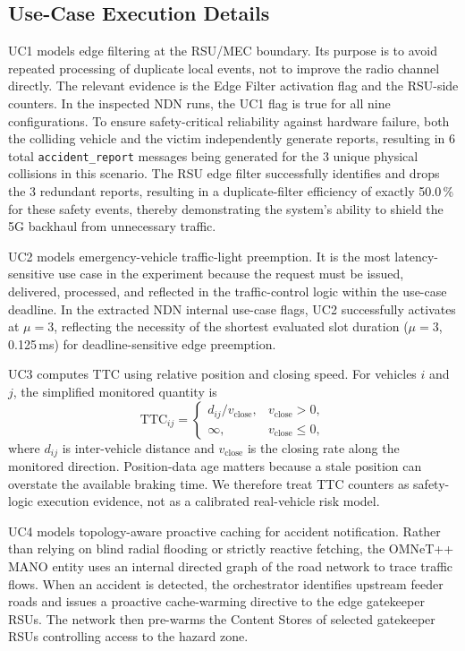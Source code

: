 \documentclass[journal]{IEEEtran}
\newcommand{\code}[1]{\texttt{\small #1}}
\begin{document}
\subsection{Use-Case Execution Details}

UC1 models edge filtering at the RSU/MEC boundary. Its purpose is to avoid repeated processing of duplicate local events, not to improve the radio channel directly. The relevant evidence is the Edge Filter activation flag and the RSU-side counters. In the inspected NDN runs, the UC1 flag is true for all nine configurations. To ensure safety-critical reliability against hardware failure, both the colliding vehicle and the victim independently generate reports, resulting in 6 total \code{accident\_report} messages being generated for the 3 unique physical collisions in this scenario. The RSU edge filter successfully identifies and drops the 3 redundant reports, resulting in a duplicate-filter efficiency of exactly 50.0\,\% for these safety events, thereby demonstrating the system's ability to shield the 5G backhaul from unnecessary traffic.

UC2 models emergency-vehicle traffic-light preemption. It is the most latency-sensitive use case in the experiment because the request must be issued, delivered, processed, and reflected in the traffic-control logic within the use-case deadline. In the extracted NDN internal use-case flags, UC2 successfully activates at $\mu=3$, reflecting the necessity of the shortest evaluated slot duration ($\mu=3$, 0.125\,ms) for deadline-sensitive edge preemption.

UC3 computes TTC using relative position and closing speed. For vehicles $i$ and $j$, the simplified monitored quantity is
\begin{equation}
  \mathrm{TTC}_{ij} =
  \begin{cases}
    d_{ij}/v_{\mathrm{close}}, & v_{\mathrm{close}}>0,\\
    \infty, & v_{\mathrm{close}}\le 0,
  \end{cases}
  \label{eq:ttc}
\end{equation}
where $d_{ij}$ is inter-vehicle distance and $v_{\mathrm{close}}$ is the
closing rate along the monitored direction. Position-data age matters because a stale position can overstate the available braking time. We therefore treat TTC counters as safety-logic execution evidence, not as a calibrated real-vehicle risk model.


UC4 models topology-aware proactive caching for accident notification. Rather than relying on blind radial flooding or strictly reactive fetching, the OMNeT++ MANO entity uses an internal directed graph of the road network to trace traffic flows. When an accident is detected, the orchestrator identifies upstream feeder roads and issues a proactive cache-warming directive to the edge gatekeeper RSUs. The network then pre-warms the Content Stores of selected gatekeeper RSUs controlling access to the hazard zone.
\end{document}
